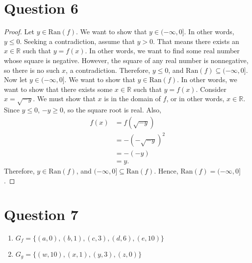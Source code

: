 \documentclass{article}
\begin{document}
\section*{Question 6}
\begin{proof}
    Let $y \in \text{Ran}(f)$.
    We want to show that $y \in (-\infty, 0]$.
    In other words, $y \leq 0$.
    Seeking a contradiction, assume that $y > 0$.
    That means there exists an $x \in \mathbb{R}$ such that $y = f(x)$.
    In other words, we want to find some real number whose square is negative.
    However, the square of any real number is nonnegative, so there is no such $x$, a contradiction.
    Therefore, $y \leq 0$, and $\text{Ran}(f) \subseteq (-\infty, 0]$.
    Now let $y \in (-\infty, 0]$.
    We want to show that $y \in \text{Ran}(f)$.
    In other words, we want to show that there exists some $x \in \mathbb{R}$ such that $y = f(x)$.
    Consider $x = \sqrt{-y}$.
    We must show that $x$ is in the domain of $f$, or in other words, $x \in \mathbb{R}$.
    Since $y \leq 0$, $-y \geq 0$, so the square root is real.
    Also,
    \begin{align*}
        f(x) &= f(\sqrt{-y}) \\
        &= -(-\sqrt{-y})^2 \\
        &= -(-y) \\
        &= y.
    \end{align*}
    Therefore, $y \in \text{Ran}(f)$, and $(-\infty, 0] \subseteq \text{Ran}(f)$.
    Hence, $\text{Ran}(f) = (-\infty, 0]$.
\end{proof}

\section*{Question 7}
\begin{enumerate}
    \item $G_f = \{(a, 0), (b, 1), (c, 3), (d, 6), (e, 10)\}$
    \item $G_g = \{(w, 10), (x, 1), (y, 3), (z, 0)\}$
\end{enumerate}
\end{document}
